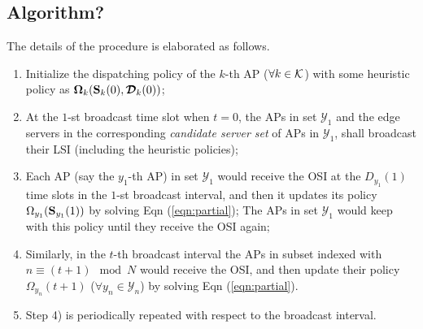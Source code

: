 \subsection{Algorithm?}
The details of the procedure is elaborated as follows.
\begin{enumerate}
    \item Initialize the dispatching policy of the $k$-th AP ($\forall k\in\mathcal{K}$) with some heuristic policy as $\boldsymbol{\Omega}_{k}(\mathbf{S}_{k}(0), \boldsymbol{\mathcal{D}}_{k}(0))$;
    \item At the $1$-st broadcast time slot when $t=0$, the APs in set $\mathcal{Y}_{1}$ and the edge servers in the corresponding \emph{candidate server set} of APs in $\mathcal{Y}_{1}$, shall broadcast their LSI (including the heuristic policies);
    \item Each AP (say the $y_1$-th AP) in set $\mathcal{Y}_{1}$ would receive the OSI at the $D_{y_1}(1)$ time slots in the $1$-st broadcast interval, and then it updates its policy $\Omega_{y_1}(\mathbf{S}_{y_1}(1))$ by solving Eqn (\ref{eqn:partial}); The APs in set $\mathcal{Y}_{1}$ would keep with this policy until they receive the OSI again;
    \item Similarly, in the $t$-th broadcast interval the APs in subset indexed with $n \equiv (t + 1)\mod{N}$ would receive the OSI, and then update their policy $\Omega_{y_n}(t+1)$ ($\forall y_n\in\mathcal{Y}_{n}$) by solving Eqn (\ref{eqn:partial}).
    \item Step 4) is periodically repeated with respect to the broadcast interval.
\end{enumerate}



